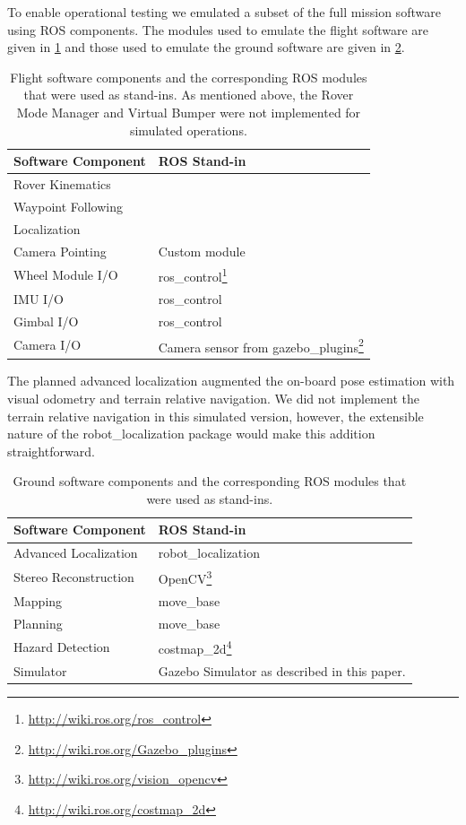 \documentclass[twocolumn,letterpaper]{IEEEAerospaceCLS}  %
\begin{document}

To enable operational testing we emulated a subset of the full mission software using ROS components. The modules used to emulate the flight software are given in \cref{tbl:flight-software-components} and those used to emulate the ground software are given in \cref{tbl:ground-software-components}.

\begin{table}[htp]
\caption{Flight software components and the corresponding ROS modules that were used as stand-ins.  
As mentioned above, the Rover Mode Manager and Virtual Bumper were not implemented for simulated operations.\label{tbl:flight-software-components}}
\begin{tabular}{l|p{4cm}}
\textbf{Software Component} & \textbf{ROS Stand-in} \\
\hline
Rover Kinematics &  \\
Waypoint Following & \\
Localization & \\
Camera Pointing & Custom module \\
Wheel Module I/O & ros\_control\footnote{\url{http://wiki.ros.org/ros_control}}\\
IMU I/O & ros\_control\\
Gimbal I/O & ros\_control\\
Camera I/O & Camera sensor from gazebo\_plugins\footnote{\url{http://wiki.ros.org/Gazebo_plugins}}\\
\hline
\end{tabular}
\end{table}

The planned advanced localization augmented the on-board pose estimation with visual odometry and terrain relative navigation.  We did not implement the terrain relative navigation in this simulated version, however, the extensible nature of the robot\_localization package would make this addition straightforward. 

\begin{table}[htp]
\caption{Ground software components and the corresponding ROS modules that were used as stand-ins.\label{tbl:ground-software-components}}
\begin{tabular}{l|p{4cm}}
\textbf{Software Component} & \textbf{ROS Stand-in} \\
\hline 
Advanced Localization & robot\_localization\\
Stereo Reconstruction & OpenCV\footnote{\url{http://wiki.ros.org/vision_opencv}}\\
Mapping & move\_base\\
Planning & move\_base\\
Hazard Detection & costmap\_2d\footnote{\url{http://wiki.ros.org/costmap_2d}}\\
Simulator & Gazebo Simulator as described in this paper.\\
\hline
\end{tabular}
\end{table}
\end{document}
